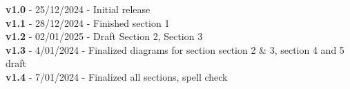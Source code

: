 \textbf{v1.0} - 25/12/2024 - Initial release \\
\textbf{v1.1} - 28/12/2024 - Finished section 1 \\
\textbf{v1.2} - 02/01/2025 - Draft Section 2, Section 3 \\
\textbf{v1.3} - 4/01/2024 - Finalized diagrams for section section 2 \& 3, section 4 and 5 draft \\
\textbf{v1.4} - 7/01/2024 - Finalized all sections, spell check \\


